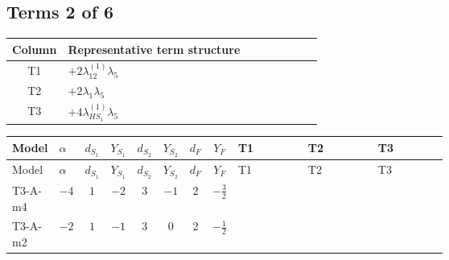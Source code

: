 \documentclass[8pt]{article}
\begin{document}
\begin{landscape}
\subsection*{Terms 2 of 6}
\begin{center}
\begin{tabular}{@{}c >{\raggedright\arraybackslash}p{0.82\linewidth}@{}}
\toprule
Column & Representative term structure \\
\midrule
T1 & \(\displaystyle +2 {\lambda_{12}^{(1)}} {\lambda_5}\) \\
\midrule
T2 & \(\displaystyle +2 {\lambda_1} {\lambda_5}\) \\
\midrule
T3 & \(\displaystyle +4 {\lambda_{HS_1}^{(1)}} {\lambda_5}\) \\
\midrule
\bottomrule
\end{tabular}
\end{center}
\smallskip
\tiny
\begin{longtable}{@{}llcccccc >{\raggedright\arraybackslash}p{0.21\linewidth} >{\raggedright\arraybackslash}p{0.21\linewidth} >{\raggedright\arraybackslash}p{0.21\linewidth}@{}}
\toprule
Model & $\alpha$ & $d_{S_1}$ & $Y_{S_1}$ & $d_{S_2}$ & $Y_{S_2}$ & $d_F$ & $Y_F$ & T1 & T2 & T3 \\
\midrule
\endfirsthead
\toprule
Model & $\alpha$ & $d_{S_1}$ & $Y_{S_1}$ & $d_{S_2}$ & $Y_{S_2}$ & $d_F$ & $Y_F$ & T1 & T2 & T3 \\
\midrule
\endhead
T3-A-m4 & $-4$ & $1$ & $-2$ & $3$ & $-1$ & $2$ & $-\frac{3}{2}$ & \scriptsize\adjustbox{max width=\linewidth}{$\begin{gathered} +2 {\lambda_{12}^{(1)}} {\lambda_5}\end{gathered}$} & \scriptsize\adjustbox{max width=\linewidth}{$\begin{gathered} +2 {\lambda_1} {\lambda_5}\end{gathered}$} & \scriptsize\adjustbox{max width=\linewidth}{$\begin{gathered} +4 {\lambda_{HS_1}^{(1)}} {\lambda_5}\end{gathered}$} \\
\midrule
T3-A-m2 & $-2$ & $1$ & $-1$ & $3$ & $0$ & $2$ & $-\frac{1}{2}$ & \scriptsize\adjustbox{max width=\linewidth}{$\begin{gathered} +2 {\lambda_{12}^{(1)}} {\lambda_5}\end{gathered}$} & \scriptsize\adjustbox{max width=\linewidth}{$\begin{gathered} +2 {\lambda_1} {\lambda_5}\end{gathered}$} & \scriptsize\adjustbox{max width=\linewidth}{$\begin{gathered} +4 {\lambda_{HS_1}^{(1)}} {\lambda_5}\end{gathered}$} \\

\end{longtable}
\end{landscape}
\end{document}
